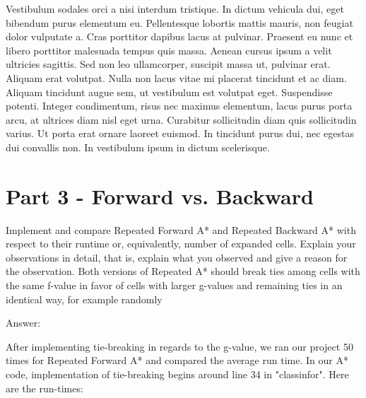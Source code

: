 \documentclass{article}
\begin{document}
Vestibulum sodales orci a nisi interdum tristique. In dictum vehicula dui, eget bibendum purus elementum eu. Pellentesque lobortis mattis mauris, non feugiat dolor vulputate a. Cras porttitor dapibus lacus at pulvinar. Praesent eu nunc et libero porttitor malesuada tempus quis massa. Aenean cursus ipsum a velit ultricies sagittis. Sed non leo ullamcorper, suscipit massa ut, pulvinar erat. Aliquam erat volutpat. Nulla non lacus vitae mi placerat tincidunt et ac diam. Aliquam tincidunt augue sem, ut vestibulum est volutpat eget. Suspendisse potenti. Integer condimentum, risus nec maximus elementum, lacus purus porta arcu, at ultrices diam nisl eget urna. Curabitur sollicitudin diam quis sollicitudin varius. Ut porta erat ornare laoreet euismod. In tincidunt purus dui, nec egestas dui convallis non. In vestibulum ipsum in dictum scelerisque.


\section{Part 3 - Forward vs. Backward}

Implement and compare Repeated Forward A* and Repeated Backward A*
with respect to their runtime or, equivalently, number of expanded cells. Explain your observations in detail, that is, explain
what you observed and give a reason for the observation. Both versions of Repeated A* should break ties among cells with
the same f-value in favor of cells with larger g-values and remaining ties in an identical way, for example randomly
\newline


Answer: \newline
\par After implementing tie-breaking in regards to the g-value, we ran our project 50 times for Repeated Forward A* and compared the average run time. In our A* code, implementation of tie-breaking begins around line 34 in "classinfor".
Here are the run-times:
\end{document}
